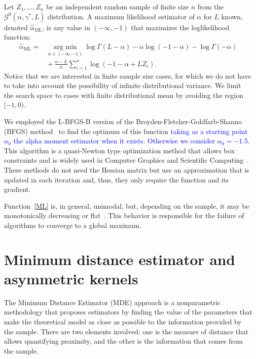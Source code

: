 \documentclass[twocolumn]{svjour3}
\newcommand{\argmin}{\operatorname*{\text{arg min }}}
\begin{document}
Let $Z_1,\dots, Z_n$ be an independent random sample of finite size $n$ from the $\mathcal G^0(\alpha,\gamma^*,L)$ distribution.
A maximum likelihood estimator of $\alpha$ for $L$ known, denoted $\widehat\alpha_{\text{{ML}}}$, is any value in $(-\infty,-1)$ that maximizes the loglikelihood function:
\begin{align}
	\hat{\alpha}_{\text{{ML}}}=&\argmin_{\alpha \in (-\infty,-1)}\log \Gamma(L-\alpha)-
	\alpha\log(-1-\alpha)-\log\Gamma(-\alpha) \nonumber \\
	&\mbox{}+\frac{\alpha-L}{n} \sum_{i=1}^n\log(-1-\alpha+L Z_i).
	\label{ML}
\end{align}
Notice that we are interested in finite sample size cases, for which we do not have to take into account the possibility of infinite distributional variance.
We limit the search space to cases with finite distributional mean by avoiding the region $[-1,0)$.

We employed the L-BFGS-B version of the Broyden-Fletcher-Goldfarb-Shanno (BFGS) method~\cite{Luenberger2008} to find the optimum of this function \textcolor{blue}{taking as a starting point $\alpha_0$ the alpha moment estimator when it exists. Otherwise we consider $\alpha_0=-1.5$}. This algorithm is a quasi-Newton type optimization method that allows box constraints and is widely used in Computer Graphics and Scientific Computing~\cite{FEI2014}. 
These methods do not need the Hessian matrix but use an approximation that is updated in each iteration and, thus, they only require the function and its gradient. 

Function~\eqref{ML} is, in general, unimodal, but, depending on the sample, it may be monotonically decreasing or flat~\cite{FreryCribariSouza:JASP:04}. 
This behavior is responsible for the failure of algorithms to converge to a global maximum.


\section{Minimum distance estimator and asymmetric kernels}
\label{distancekernel}

The Minimum Distance Estimator (MDE) approach is a nonparametric methodology that proposes estimators by finding the value of the parameters that make the theoretical model as close as possible to the information provided by the sample. 
There are two elements involved: one is the measure of distance that allows quantifying proximity, and the other is the information that comes from the sample.
\end{document}
